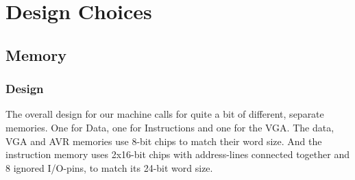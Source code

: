 \section {Design Choices}

\subsection {Memory}
\subsubsection{Design}
The overall design for our machine calls for quite a bit of different, separate memories. One for Data,
one for Instructions and one for the VGA. The data, VGA and AVR memories use 8-bit chips to match
their word size. And the instruction memory uses 2x16-bit chips with address-lines connected
together and 8 ignored I/O-pins, to match its 24-bit word size.
\begin{comment}
Tok dette ut siden dette allerede er diskutert tidligere i rapporten
~Mads

One of the
earliest design choices that led to this was the decision to have separate instruction/data-memories.
The reasoning behind this choice being that we could avoid the bottleneck that would be introduced
from sharing memories.
\end{comment}

